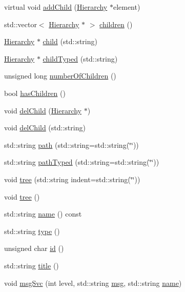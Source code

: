 \begin{DoxyCompactItemize}
virtual void \hyperlink{classHierarchy_ad677774ff38fcb257c04a3a10d471fac}{add\+Child} (\hyperlink{classHierarchy}{Hierarchy} $\ast$element)
\item 
std\+::vector$<$ \hyperlink{classHierarchy}{Hierarchy} $\ast$ $>$ \hyperlink{classHierarchy_aa9a76f69e98e052ee1a6e32cea006288}{children} ()
\item 
\hyperlink{classHierarchy}{Hierarchy} $\ast$ \hyperlink{classHierarchy_a1e207f973c694b538bf90107b4868817}{child} (std\+::string)
\item 
\hyperlink{classHierarchy}{Hierarchy} $\ast$ \hyperlink{classHierarchy_a0c15a5276a3b80b4354d6bd8a01e0708}{child\+Typed} (std\+::string)
\item 
unsigned long \hyperlink{classHierarchy_ab16e84de65fd84e14001a6cf941c8be4}{number\+Of\+Children} ()
\item 
bool \hyperlink{classHierarchy_a255174fe4d316d2a3f430dcb9dab29f1}{has\+Children} ()
\item 
void \hyperlink{classHierarchy_a2b2b359fac003233f65786a616766bde}{del\+Child} (\hyperlink{classHierarchy}{Hierarchy} $\ast$)
\item 
void \hyperlink{classHierarchy_a1928ac7615fe0b5e55cd707f70dc6781}{del\+Child} (std\+::string)
\item 
std\+::string \hyperlink{classHierarchy_aa7990fa7caf132d83e361ce033c6c65a}{path} (std\+::string=std\+::string(\char`\"{}\char`\"{}))
\item 
std\+::string \hyperlink{classHierarchy_a1efd56cd164d328d2002e53a10a19b8c}{path\+Typed} (std\+::string=std\+::string(\char`\"{}\char`\"{}))
\item 
void \hyperlink{classHierarchy_a76e914b9a677a22a82deb74d892bf261}{tree} (std\+::string indent=std\+::string(\char`\"{}\char`\"{}))
\item 
void \hyperlink{classHierarchy_a594c294c5f60c230e106d522ed008212}{tree} ()
\item 
std\+::string \hyperlink{classObject_a300f4c05dd468c7bb8b3c968868443c1}{name} () const
\item 
std\+::string \hyperlink{classObject_a84f99f70f144a83e1582d1d0f84e4e62}{type} ()
\item 
unsigned char \hyperlink{classObject_af99145335cc61ff6e2798ea17db009d2}{id} ()
\item 
std\+::string \hyperlink{classObject_a73a0f1a41828fdd8303dd662446fb6c3}{title} ()
\item 
void \hyperlink{classObject_a3f9d5537ebce0c0f2bf6ae4d92426f3c}{msg\+Svc} (int level, std\+::string \hyperlink{classObject_a58b2d0618c2d08cf2383012611528d97}{msg}, std\+::string \hyperlink{classObject_a300f4c05dd468c7bb8b3c968868443c1}{name})

\end{DoxyCompactItemize}
